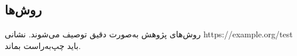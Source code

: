 \subsection{روش‌ها}
روش‌های پژوهش به‌صورت دقیق توصیف می‌شوند. نشانی https://example.org/test باید چپ‌به‌راست بماند.

